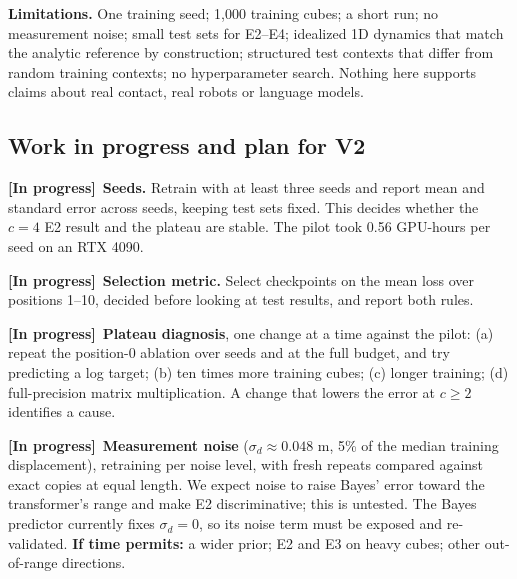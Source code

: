 \documentclass{article}
\newcommand{\inprog}[1]{\textbf{[In progress]}~#1}
\begin{document}
\textbf{Limitations.} One training seed; 1,000 training cubes; a short run; no measurement noise; small test sets for E2--E4; idealized 1D dynamics that match the analytic reference by construction; structured test contexts that differ from random training contexts; no hyperparameter search. Nothing here supports claims about real contact, real robots or language models.

\subsection{Work in progress and plan for V2}\label{sec:progress}
\inprog{\textbf{Seeds.} Retrain with at least three seeds and report mean and standard error across seeds, keeping test sets fixed. This decides whether the $c=4$ E2 result and the plateau are stable. The pilot took 0.56 GPU-hours per seed on an RTX 4090.}

\inprog{\textbf{Selection metric.} Select checkpoints on the mean loss over positions 1--10, decided before looking at test results, and report both rules.}

\inprog{\textbf{Plateau diagnosis}, one change at a time against the pilot: (a) repeat the position-0 ablation over seeds and at the full budget, and try predicting a log target; (b) ten times more training cubes; (c) longer training; (d) full-precision matrix multiplication. A change that lowers the error at $c\ge2$ identifies a cause.}

\inprog{\textbf{Measurement noise} ($\sigma_d\approx0.048$ m, 5\% of the median training displacement), retraining per noise level, with fresh repeats compared against exact copies at equal length. We expect noise to raise Bayes' error toward the transformer's range and make E2 discriminative; this is untested. The Bayes predictor currently fixes $\sigma_d=0$, so its noise term must be exposed and re-validated. \textbf{If time permits:} a wider prior; E2 and E3 on heavy cubes; other out-of-range directions.}
\end{document}
